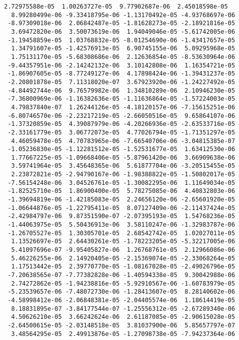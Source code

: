 \documentclass[11pt]{article}
\begin{document}
\begin{Verbatim}[commandchars=\\\{\}]
  2.72975588e-05  1.00263727e-05  9.77902687e-06  2.45018598e-05
  8.99280499e-06 -9.33418795e-06 -1.13170492e-05 -4.93768697e-06
 -8.97309018e-06  2.06842487e-05 -1.81628273e-05 -2.18921816e-05
  3.69472820e-06  3.50073619e-06  1.94049046e-05 -5.61742005e-06
 -1.19458859e-05  1.03768832e-05 -8.01254690e-06 -1.43417657e-05
  1.34791607e-05 -1.42576913e-05  6.90745155e-06  5.09295968e-05
  1.75131170e-05 -5.68308686e-06  2.12636854e-05 -8.53630964e-06
 -9.44357951e-06 -2.14242132e-06  3.10142808e-06  1.16354721e-05
 -1.86907605e-05 -8.77249127e-06  4.17898424e-06 -1.39431237e-05
 -2.20801878e-05  7.11318020e-07  3.67923920e-06 -1.24227492e-05
 -4.84492744e-06  9.76579982e-06  1.34810289e-06  2.10946230e-05
 -7.36800969e-06 -1.16382636e-05 -1.11636864e-05 -1.57224003e-05
  4.79837840e-07  1.26244126e-05 -4.18120157e-06 -7.15615251e-06
 -6.80746570e-06 -2.23217219e-05 -2.66050516e-05  9.65864107e-06
 -1.37320859e-05  4.39087979e-06 -4.20266936e-05 -2.63533716e-05
 -2.33161779e-05  3.06772073e-05  4.77026794e-05 -1.71351297e-05
  4.46059478e-05  4.70783965e-06 -7.66540706e-06 -3.04815385e-07
 -1.05236830e-05 -1.12281512e-05 -1.52531677e-05  1.63412530e-06
  1.77667225e-05 -1.09668406e-05 -5.87961420e-06  3.66909638e-06
  3.59741964e-05  3.45648365e-06  5.61877704e-06 -3.20515455e-05
  2.23872821e-05 -2.94790167e-06 -1.98388822e-05 -1.50802017e-05
 -7.56154248e-06  3.04526761e-05 -1.30082295e-06  1.11649034e-05
 -1.82525710e-05  1.86900400e-05  5.78275085e-06  4.40832803e-06
 -1.39694819e-06 -1.42185083e-05  2.24656120e-06 -2.65601920e-05
 -1.06644876e-05 -1.22795411e-05  8.07127409e-06 -2.11437424e-05
 -2.42984797e-06  9.87351590e-07 -2.07395193e-05  1.54768236e-05
 -1.44063975e-05  5.50436913e-06  3.58110247e-06 -1.32983787e-06
 -1.26705527e-05  1.30305701e-05  2.68542742e-05  1.02027011e-05
  1.13526697e-05  2.64430261e-05 -1.78223205e-05 -5.32217005e-06
  5.41097696e-07 -9.95405827e-06  1.26768761e-05  2.12966086e-06
  5.46226255e-06  2.14920405e-05 -2.15369074e-05 -2.33068264e-05
  1.17513442e-05  2.39770770e-05 -1.08167028e-05 -2.49026796e-05
 -7.20638565e-07 -7.77382828e-06 -1.40594338e-05  9.30042988e-06
  2.74272862e-05 -1.94238816e-05 -5.92910567e-06 -1.60783979e-05
 -5.23539657e-06 -7.48072730e-06 -1.28413607e-05  8.28140602e-06
 -4.58998412e-06 -2.06848381e-05 -2.04405574e-06  1.18614419e-05
  8.18831895e-07 -3.84177544e-07 -1.25556312e-05 -2.67289340e-06
  4.50626210e-05  3.66242624e-06  2.61187085e-05 -2.90615028e-05
 -2.64500615e-05 -2.03148518e-05  3.81037900e-06  5.85657797e-07
  3.48564295e-05  2.49913876e-05 -1.27098738e-05 -7.94237364e-06

\end{Verbatim}
\end{document}
